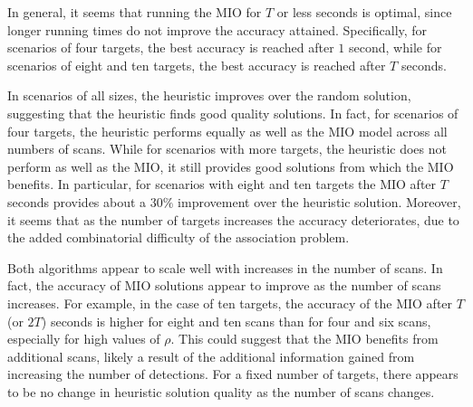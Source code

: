 In general, it seems that running the MIO for $T$ or less seconds is optimal, since longer running times do not improve the accuracy attained. Specifically, for scenarios of four targets, the best accuracy is reached after $1$ second, while for scenarios of eight and ten targets, the best accuracy is reached after $T$ seconds. 

In scenarios of all sizes, the heuristic improves over the random solution, suggesting that the heuristic finds good quality solutions. In fact, for scenarios of four targets, the heuristic performs equally as well as the MIO model across all numbers of scans. While for scenarios with more targets, the heuristic does not perform as well as the MIO, it still provides good solutions from which the MIO benefits. In particular, for scenarios with eight and ten targets the MIO after $T$ seconds provides about a $30\%$ improvement over the heuristic solution. Moreover, it seems that as the number of targets increases the accuracy deteriorates, due to the added combinatorial difficulty of the association problem. 

Both algorithms appear to scale well with increases in the number of scans. In fact, the accuracy of MIO solutions appear to improve as the number of scans increases. For example, in the case of ten targets, the accuracy of the MIO after $T$ (or $2T$) seconds is higher for eight and ten scans than for four and six scans, especially for high values of $\rho$. This could suggest that the MIO benefits from additional scans, likely a result of the additional information gained from increasing the number of detections. For a fixed number of targets, there appears to be no change in heuristic solution quality as the number of scans changes. 

